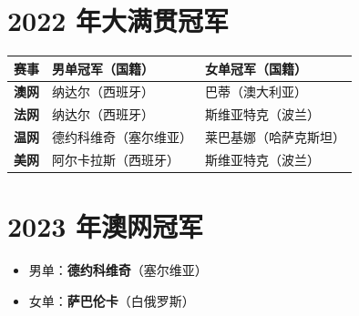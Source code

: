 
\section{2022 年大满贯冠军}

\begin{center}
\begin{tabular}{@{} >{\bfseries}l l l @{}}
    \toprule
    赛事 & 男单冠军（国籍） & 女单冠军（国籍） \\
    \midrule
    澳网 & 纳达尔（西班牙） & 巴蒂（澳大利亚） \\
    法网 & 纳达尔（西班牙） & 斯维亚特克（波兰） \\
    温网 & 德约科维奇（塞尔维亚） & 莱巴基娜（哈萨克斯坦） \\
    美网 & 阿尔卡拉斯（西班牙） & 斯维亚特克（波兰） \\
    \bottomrule
\end{tabular}
\end{center}

\section{2023 年澳网冠军}

\begin{itemize}
    \item 男单：\textbf{德约科维奇}（塞尔维亚）
    \item 女单：\textbf{萨巴伦卡}（白俄罗斯）
\end{itemize}

